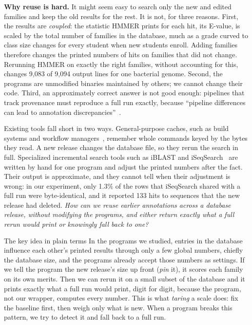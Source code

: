 \documentclass[letterpaper,twocolumn,10pt]{article}
\theoremstyle{definition}
\begin{document}
\textbf{Why reuse is hard.} It might seem easy to search only the new and edited families and keep the old results
for the rest. It is not, for three reasons. First, the results are \textit{coupled}: the statistic HMMER prints for
each hit, its E-value, is scaled by the total number of families in the database, much as a grade curved to class
size changes for every student when new students enroll. Adding families therefore changes the printed numbers of
hits on families that did not change. Rerunning HMMER on exactly the right families, without accounting for this,
changes 9{,}083 of 9{,}094 output lines for one bacterial genome.
Second, the programs are unmodified binaries
maintained by others; we cannot change their code. Third, an approximately correct answer is not good enough:
pipelines that track provenance must reproduce a full run exactly, because ``pipeline differences can lead to
annotation discrepancies''~\cite{chen2021img}.

Existing tools fall short in two ways. General\nobreakdash-purpose caches, such as build systems and workflow
managers~\cite{curtsinger2022riker,xie2026incr,shiptoski2023processcache,ditommaso2017nextflow,molder2021snakemake},
remember whole commands keyed by the bytes they read. A new release changes the database file, so they rerun the
search in full. Specialized incremental search tools such as iBLAST and iSeqSearch~\cite{dash2021iblast,yoo2025iseqsearch}
are written by hand for one program and adjust the printed numbers after the fact. Their output is approximate, and
they cannot tell when their adjustment is wrong: in our experiment, only 1.3\% of the rows that iSeqSearch shared
with a full run were byte\nobreakdash-identical, and it reported 133 hits to sequences that the new release had deleted.
\textit{How can we reuse earlier annotations across a database release, without modifying the programs, and either
return exactly what a full rerun would print or knowingly fall back to one?}

\begin{plainbox}{The key idea in plain terms}
In the programs we studied, entries in the database influence each other's printed results through only a few
global numbers, chiefly the database size, and the programs already accept those numbers as settings. If we tell
the program the new release's size up front (\textit{pin} it), it scores each family on its own merits. Then we can
rerun it on a small subset of the database and it prints exactly what a full run would print, digit for digit,
because the program, not our wrapper, computes every number. This is what \textit{taring} a scale does: fix the
baseline first, then weigh only what is new. When a program breaks this pattern, we try to detect it and fall back to a
full run.
\end{plainbox}
\end{document}
